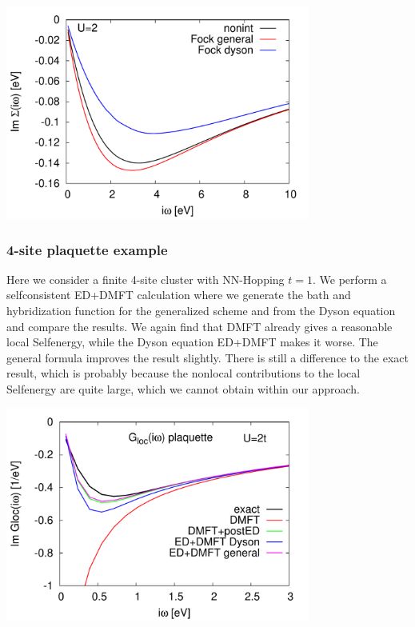 \documentclass[12pt,a4paper]{scrartcl}
\numberwithin{equation}{section}
\begin{document}
\includegraphics[width=0.75\textwidth]{figs/bathNonlocFromDMFTderiv/1dhub_simp.pdf}

\subsubsection{4-site plaquette example}
Here we consider a finite 4-site cluster with NN-Hopping $t=1$. We perform a selfconsistent
ED+DMFT calculation where we generate the bath 
and hybridization function for the generalized scheme and from the Dyson equation 
and compare the results. We again find that DMFT already gives a reasonable local Selfenergy,
while the Dyson equation ED+DMFT makes it worse. The general formula improves the result
slightly. There is still a difference to the exact result, which is probably because
the nonlocal contributions to the local Selfenergy are quite large, which we cannot obtain 
within our approach.

\includegraphics[width=0.75\textwidth]{figs/bathNonlocFromDMFTderiv/plaquette_eddmft.pdf}
\end{document}

